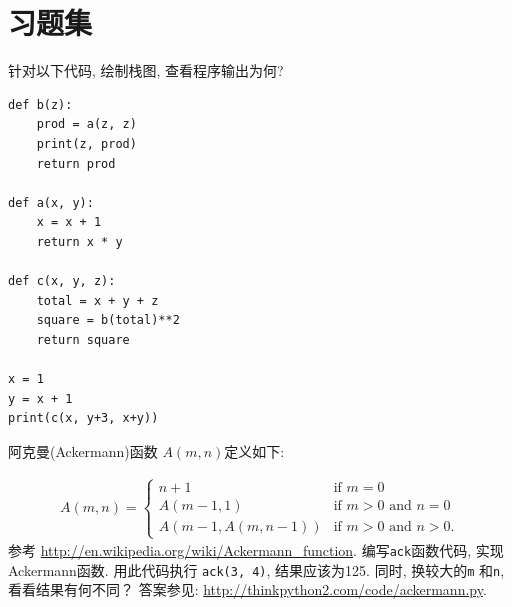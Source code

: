 \documentclass[10pt]{book}
\begin{document}
\section{习题集}

\begin{exercise}
针对以下代码, 绘制栈图, 查看程序输出为何?

\begin{verbatim}
def b(z):
    prod = a(z, z)
    print(z, prod)
    return prod

def a(x, y):
    x = x + 1
    return x * y

def c(x, y, z):
    total = x + y + z
    square = b(total)**2
    return square

x = 1
y = x + 1
print(c(x, y+3, x+y))
\end{verbatim}

\end{exercise}


\begin{exercise}
\label{ackermann}

阿克曼(Ackermann)函数 $A(m, n)$定义如下:

\begin{eqnarray*}
A(m, n) = \begin{cases} 
              n+1 & \mbox{if } m = 0 \\ 
        A(m-1, 1) & \mbox{if } m > 0 \mbox{ and } n = 0 \\ 
A(m-1, A(m, n-1)) & \mbox{if } m > 0 \mbox{ and } n > 0.
\end{cases} 
\end{eqnarray*}
%
参考 \url{http://en.wikipedia.org/wiki/Ackermann_function}.
编写{\tt ack}函数代码, 实现Ackermann函数. 
用此代码执行 {\tt ack(3, 4)}, 结果应该为125. 
同时, 换较大的{\tt m} 和{\tt n}, 看看结果有何不同？
答案参见: \url{http://thinkpython2.com/code/ackermann.py}.

\end{exercise}
\end{document}

